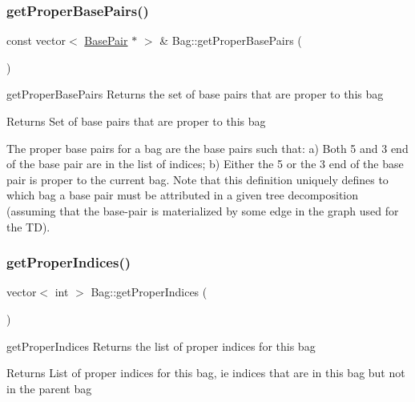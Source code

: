 \subsubsection{\texorpdfstring{get\+Proper\+Base\+Pairs()}{getProperBasePairs()}}
{\footnotesize\ttfamily const vector$<$ \hyperlink{class_base_pair}{Base\+Pair} $\ast$ $>$ \& Bag\+::get\+Proper\+Base\+Pairs (\begin{DoxyParamCaption}{ }\end{DoxyParamCaption})}



get\+Proper\+Base\+Pairs Returns the set of base pairs that are proper to this bag 

\begin{DoxyReturn}{Returns}
Set of base pairs that are proper to this bag
\end{DoxyReturn}
The proper base pairs for a bag are the base pairs such that\+: a) Both 5\textquotesingle{} and 3\textquotesingle{} end of the base pair are in the list of indices; b) Either the 5\textquotesingle{} or the 3\textquotesingle{} end of the base pair is proper to the current bag. Note that this definition uniquely defines to which bag a base pair must be attributed in a given tree decomposition (assuming that the base-\/pair is materialized by some edge in the graph used for the TD). \mbox{\label{class_bag_a84860e8af1eed9547b7c20d77d29da7d}} 
\subsubsection{\texorpdfstring{get\+Proper\+Indices()}{getProperIndices()}}
{\footnotesize\ttfamily vector$<$ int $>$ Bag\+::get\+Proper\+Indices (\begin{DoxyParamCaption}{ }\end{DoxyParamCaption})}



get\+Proper\+Indices Returns the list of proper indices for this bag 

\begin{DoxyReturn}{Returns}
List of proper indices for this bag, ie indices that are in this bag but not in the parent bag 
\end{DoxyReturn}
\mbox{\label{class_bag_a1a7660f8e31d6941fdec07c86e0fe3ac}} 
